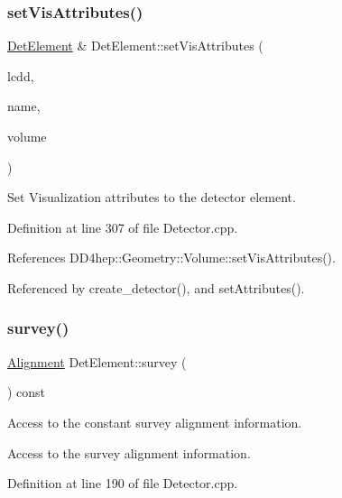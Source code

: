 \subsubsection{\texorpdfstring{set\+Vis\+Attributes()}{setVisAttributes()}}
{\footnotesize\ttfamily \hyperlink{class_d_d4hep_1_1_geometry_1_1_det_element}{Det\+Element} \& Det\+Element\+::set\+Vis\+Attributes (\begin{DoxyParamCaption}\item[{const \hyperlink{class_d_d4hep_1_1_geometry_1_1_l_c_d_d}{L\+C\+DD} \&}]{lcdd,  }\item[{const std\+::string \&}]{name,  }\item[{const \hyperlink{class_d_d4hep_1_1_geometry_1_1_volume}{Volume} \&}]{volume }\end{DoxyParamCaption})}



Set Visualization attributes to the detector element. 



Definition at line 307 of file Detector.\+cpp.



References D\+D4hep\+::\+Geometry\+::\+Volume\+::set\+Vis\+Attributes().



Referenced by create\+\_\+detector(), and set\+Attributes().

\hypertarget{class_d_d4hep_1_1_geometry_1_1_det_element_aec33daf8981acf912a9e8eb08fe68dee}{}\label{class_d_d4hep_1_1_geometry_1_1_det_element_aec33daf8981acf912a9e8eb08fe68dee} 
\subsubsection{\texorpdfstring{survey()}{survey()}}
{\footnotesize\ttfamily \hyperlink{class_d_d4hep_1_1_geometry_1_1_det_element_a5e5bddb6f1ba24c21af381b9bfeb3dba}{Alignment} Det\+Element\+::survey (\begin{DoxyParamCaption}{ }\end{DoxyParamCaption}) const}



Access to the constant survey alignment information. 

Access to the survey alignment information. 

Definition at line 190 of file Detector.\+cpp.



